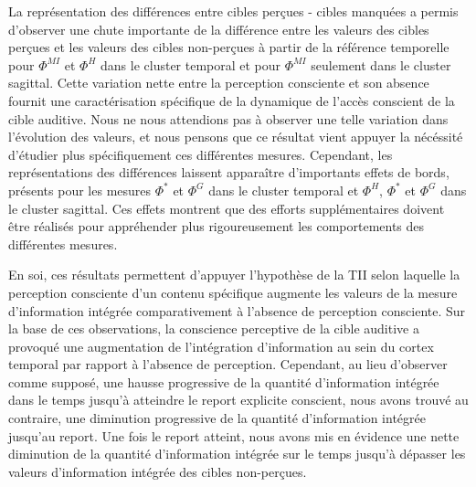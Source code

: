 La représentation des différences entre cibles perçues - cibles manquées a permis d'observer une chute importante de la différence entre les valeurs des cibles perçues et les valeurs des cibles non-perçues à partir de la référence temporelle pour $\Phi^{MI}$ et $\Phi^{H}$ dans le cluster temporal et pour $\Phi^{MI}$ seulement dans le cluster sagittal. 
Cette variation nette entre la perception consciente et son absence fournit une caractérisation spécifique de la dynamique de l'accès conscient de la cible auditive. 
Nous ne nous attendions pas à observer une telle variation dans l'évolution des valeurs, et nous pensons que ce résultat vient appuyer la nécéssité d'étudier plus spécifiquement ces différentes mesures. 
Cependant, les représentations des différences laissent apparaître d'importants effets de bords, présents pour les mesures $\Phi^{*}$ et $\Phi^{G}$ dans le cluster temporal et $\Phi^{H}$, $\Phi^{*}$ et $\Phi^{G}$ dans le cluster sagittal. 
Ces effets montrent que des efforts supplémentaires doivent être réalisés pour appréhender plus rigoureusement les comportements des différentes mesures. 

En soi, ces résultats permettent d'appuyer l'hypothèse de la TII selon laquelle la perception consciente d'un contenu spécifique augmente les valeurs de la mesure d'information intégrée comparativement à l'absence de perception consciente. 
Sur la base de ces observations, la conscience perceptive de la cible auditive a provoqué une augmentation de l'intégration d'information au sein du cortex temporal par rapport à l'absence de perception. 
Cependant, au lieu d'observer comme supposé, une hausse progressive de la quantité d'information intégrée dans le temps jusqu'à atteindre le report explicite conscient, nous avons trouvé au contraire, une diminution progressive de la quantité d'information intégrée jusqu'au report. 
Une fois le report atteint, nous avons mis en évidence une nette diminution de la quantité d'information intégrée sur le temps jusqu'à dépasser les valeurs d'information intégrée des cibles non-perçues. 

